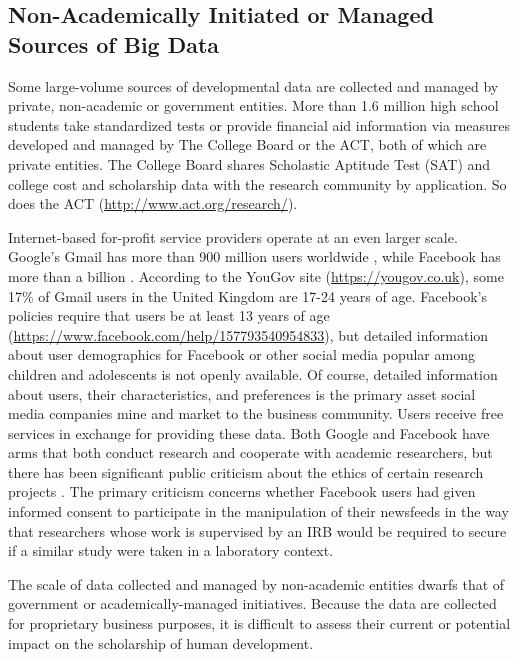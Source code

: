 \documentclass[letterpaper,man,apacite]{apa6}
\begin{document}
\subsection{Non-Academically Initiated or Managed Sources of Big Data}

Some large-volume sources of developmental data are collected and managed by private, non-academic or government entities.
More than 1.6 million high school students \cite{lewin_more_2013} take standardized tests or provide financial aid information via measures developed and managed by The College Board or the ACT, both of which are private entities.
The College Board shares Scholastic Aptitude Test (SAT) and college cost and scholarship data with the research community by application.
So does the ACT (\url{http://www.act.org/research/}).

Internet-based for-profit service providers operate at an even larger scale.
Google's Gmail has more than 900 million users worldwide \cite{lardinois_gmail_2015}, while Facebook has more than a billion \cite{facebook_2014}.
According to the YouGov site (\url{https://yougov.co.uk}), some 17\% of Gmail users in the United Kingdom are 17-24 years of age.
Facebook's policies require that users be at least 13 years of age (\url{https://www.facebook.com/help/157793540954833}), but detailed information about user demographics for Facebook or other social media popular among children and adolescents is not openly available.
Of course, detailed information about users, their characteristics, and preferences is the primary asset social media companies mine and market to the business community.
Users receive free services in exchange for providing these data.
Both Google and Facebook have arms that both conduct research and cooperate with academic researchers, but there has been significant public criticism about the ethics of certain research projects \cite{meyer_everything_2014}.
The primary criticism concerns whether Facebook users had given informed consent to participate in the manipulation of their newsfeeds in the way that researchers whose work is supervised by an IRB would be required to secure if a similar study were taken in a laboratory context.

The scale of data collected and managed by non-academic entities dwarfs that of government or academically-managed initiatives.
Because the data are collected for proprietary business purposes, it is difficult to assess their current or potential impact on the scholarship of human development.
\end{document}
